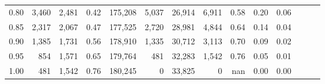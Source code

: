 \begin{tabular}{rrrrrrrrrrrrrr}
0.80 &   3,460 &  2,481 &  0.42 &  175,208 &    5,037 &  26,914 &   6,911 &  0.58 &  0.20 &      0.06 \\
0.85 &   2,317 &  2,067 &  0.47 &  177,525 &    2,720 &  28,981 &   4,844 &  0.64 &  0.14 &      0.04 \\
0.90 &   1,385 &  1,731 &  0.56 &  178,910 &    1,335 &  30,712 &   3,113 &  0.70 &  0.09 &      0.02 \\
0.95 &     854 &  1,571 &  0.65 &  179,764 &      481 &  32,283 &   1,542 &  0.76 &  0.05 &      0.01 \\
1.00 &     481 &  1,542 &  0.76 &  180,245 &        0 &  33,825 &       0 &   nan &  0.00 &      0.00 \\
\bottomrule
\end{tabular}
